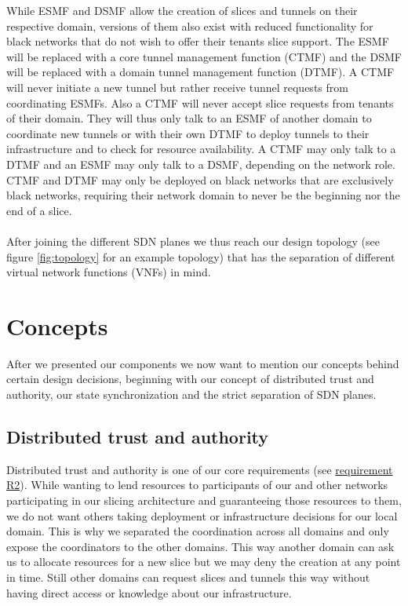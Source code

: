 While ESMF and DSMF allow the creation of slices and tunnels on their respective domain, versions of them also exist with reduced functionality for black networks that do not wish to offer their tenants slice support. The ESMF will be replaced with a core tunnel management function (CTMF) and the DSMF will be replaced with a domain tunnel management function (DTMF). A CTMF will never initiate a new tunnel but rather receive tunnel requests from coordinating ESMFs. Also a CTMF will never accept slice requests from tenants of their domain. They will thus only talk to an ESMF of another domain to coordinate new tunnels or with their own DTMF to deploy tunnels to their infrastructure and to check for resource availability. A CTMF may only talk to a DTMF and an ESMF may only talk to a DSMF, depending on the network role. CTMF and DTMF may only be deployed on black networks that are exclusively black networks, requiring their network domain to never be the beginning nor the end of a slice.

\paragraph{} After joining the different SDN planes we thus reach our design topology (see figure \ref{fig:topology} for an example topology) that has the separation of different virtual network functions (VNFs) in mind.

\section{Concepts}
\label{design_concepts}
After we presented our components we now want to mention our concepts behind certain design decisions, beginning with our concept of distributed trust and authority, our state synchronization and the strict separation of SDN planes.

\subsection{Distributed trust and authority}
Distributed trust and authority is one of our core requirements (see \hyperref[R2]{requirement R2}). While wanting to lend resources to participants of our and other networks participating in our slicing architecture and guaranteeing those resources to them, we do not want others taking deployment or infrastructure decisions for our local domain. This is why we separated the coordination across all domains and only expose the coordinators to the other domains. This way another domain can ask us to allocate resources for a new slice but we may deny the creation at any point in time. Still other domains can request slices and tunnels this way without having direct access or knowledge about our infrastructure.


